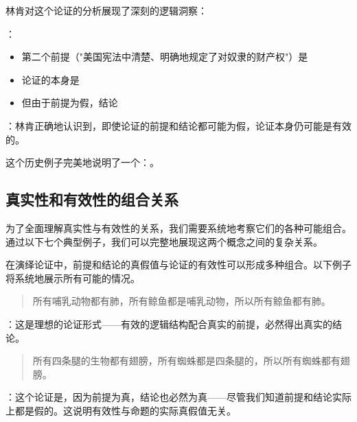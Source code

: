 \begin{examplebox}[title=林肯的逻辑分析]
林肯对这个论证的分析展现了深刻的逻辑洞察：

：
\begin{itemize}
  \item 第二个前提（"美国宪法中清楚、明确地规定了对奴隶的财产权"）是
  \item 论证的本身是
  \item 但由于前提为假，结论
\end{itemize}

：林肯正确地认识到，即使论证的前提和结论都可能为假，论证本身仍可能是有效的。
\end{examplebox}

这个历史例子完美地说明了一个：。

\subsection{真实性和有效性的组合关系}

为了全面理解真实性与有效性的关系，我们需要系统地考察它们的各种可能组合。通过以下七个典型例子，我们可以完整地展现这两个概念之间的复杂关系。

\begin{theorembox}[title=真实性与有效性的组合类型]
在演绎论证中，前提和结论的真假值与论证的有效性可以形成多种组合。以下例子将系统地展示所有可能的情况。
\end{theorembox}

\begin{examplebox}[title=类型I：有效论证 + 真前提 + 真结论]
\begin{quotation}
所有哺乳动物都有肺，所有鲸鱼都是哺乳动物，所以所有鲸鱼都有肺。
\end{quotation}

：这是理想的论证形式——有效的逻辑结构配合真实的前提，必然得出真实的结论。
\end{examplebox}

\begin{examplebox}[title=类型II：有效论证 + 假前提 + 假结论]
\begin{quotation}
所有四条腿的生物都有翅膀，所有蜘蛛都是四条腿的，所以所有蜘蛛都有翅膀。
\end{quotation}

：这个论证是，因为前提为真，结论也必然为真——尽管我们知道前提和结论实际上都是假的。这说明有效性与命题的实际真假值无关。
\end{examplebox}

